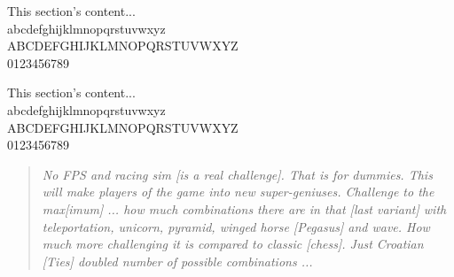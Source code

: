\documentclass[a5paper,12pt,draft]{book}
\begin{document}
\tiny{This section's content... \\
abcdefghijklmnopqrstuvwxyz \\
ABCDEFGHIJKLMNOPQRSTUVWXYZ \\
0123456789}

\normalsize{This section's content... \\
abcdefghijklmnopqrstuvwxyz \\
ABCDEFGHIJKLMNOPQRSTUVWXYZ \\
0123456789}

\vspace*{0.1\textheight}
\clearpage

\listoffigures

\listoftables

\tableofcontents
\clearpage


\thispagestyle{empty}
\begin{quotation}
    \it
    No FPS and racing sim [is a real challenge]. That is for
    dummies. This will make players of the game into new
    super-geniuses. Challenge to the max[imum] ... how much
    combinations there are in that [last variant] with
    teleportation, unicorn, pyramid, winged horse [Pegasus]
    and wave. How much more challenging it is compared to
    classic [chess]. Just Croatian [Ties] doubled number of
    possible combinations ...
\end{quotation}
\vfill
\hspace*{\fill}{\LaTeXe}
\clearpage
\end{document}
